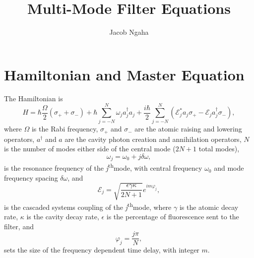 \documentclass{article}
\title{Multi-Mode Filter Equations}
\author{Jacob Ngaha}
\newcommand{\ssth}{\textsuperscript{th}}
\begin{document}
\maketitle

\section{Hamiltonian and Master Equation}

The Hamiltonian is
\begin{equation}
	H = \hbar \frac{\Omega}{2} \left( \sigma_{+} + \sigma_{-} \right) + \hbar \sum_{j=-N}^{N} \omega_{j} a^{\dagger}_{j} a_{j} + \frac{i \hbar}{2} \sum_{j=-N}^{N} \left( \mathcal{E}_{j}^{*} a_{j} \sigma_{+} - \mathcal{E}_{j} a^{\dagger}_{j} \sigma_{-} \right),
\end{equation}
where $\Omega$ is the Rabi frequency, $\sigma_{+}$ and $\sigma_{-}$ are the atomic raising and lowering operators, $a^{\dagger}$ and $a$ are the cavity photon creation and annihilation operators, $N$ is the number of modes either side of the central mode ($2N+1$ total modes),
\begin{equation}
	\omega_{j} = \omega_{0} + j \delta\omega,
\end{equation}
is the resonance frequency of the \textit{j}\ssth mode, with central frequency $\omega_{0}$ and mode frequency spacing $\delta\omega$, and
\begin{equation}
	\mathcal{E}_{j} = \sqrt{\frac{\epsilon \gamma \kappa}{2N + 1}} e^{i m \varphi_{j}},
\end{equation}
is the cascaded systems coupling of the \textit{j}\ssth mode, where $\gamma$ is the atomic decay rate, $\kappa$ is the cavity decay rate, $\epsilon$ is the percentage of fluorescence sent to the filter, and
\begin{equation}
	\varphi_{j} = \frac{j \pi}{N},
\end{equation}
sets the size of the frequency dependent time delay, with integer $m$.
\end{document}

